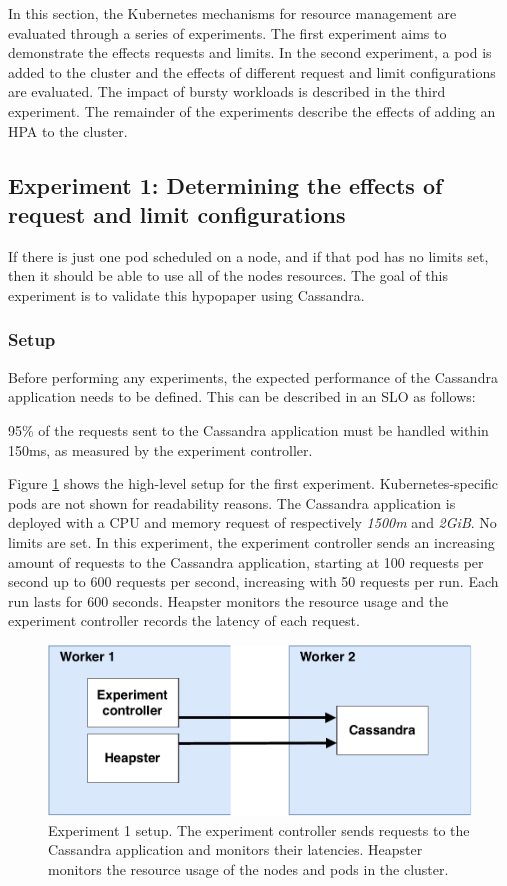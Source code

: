 In this section, the Kubernetes mechanisms for resource management are evaluated through a series of experiments. The first experiment aims to demonstrate the effects requests and limits. In the second experiment, a pod is added to the cluster and the effects of different request and limit configurations are evaluated. The impact of bursty workloads is described in the third experiment. The remainder of the experiments describe the effects of adding an HPA to the cluster.


\subsection{Experiment 1: Determining the effects of request and limit configurations}
If there is just one pod scheduled on a node, and if that pod has no limits set, then it should be able to use all of the nodes resources. The goal of this experiment is to validate this hypopaper using Cassandra.

\subsubsection{Setup}
Before performing any experiments, the expected performance of the Cassandra application needs to be defined. This can be described in an SLO as follows:

\begin{slo}
95\% of the requests sent to the Cassandra application must be handled within 150ms, as measured by the experiment controller.
\end{slo}

Figure \ref{fig:experiment1} shows the high-level setup for the first experiment. Kubernetes-specific pods are not shown for readability reasons. The Cassandra application is deployed with a CPU and memory request of respectively \textit{1500m} and \textit{2GiB}. No limits are set. In this experiment, the experiment controller sends an increasing amount of requests to the Cassandra application, starting at 100 requests per second up to 600 requests per second, increasing with 50 requests per run. Each run lasts for 600 seconds. Heapster monitors the resource usage and the experiment controller records the latency of each request.

\begin{figure}
\centering
\includegraphics[width=0.60\columnwidth]{Images/Experiments/Experiment_1.pdf}
\caption{Experiment 1 setup. The experiment controller sends requests to the Cassandra application and monitors their latencies. Heapster monitors the resource usage of the nodes and pods in the cluster.}
\label{fig:experiment1} 
\end{figure}

